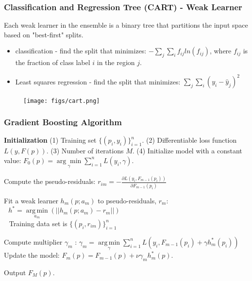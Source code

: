 \documentclass[t, pdftex]{beamer}
\begin{document}
\begin{frame}[shrink=10]
\frametitle{Classification and Regression Tree (CART) - Weak Learner}
Each weak learner in the ensemble is a binary tree that partitions the input space based on "best-first" splits.  
\begin{itemize}
\item classification - find the split that minimizes: $-\sum_j\sum_i f_{ij} ln(f_{ij})$, where $f_{ij}$ is the fraction of class label $i$ in the region $j$.
\item Least squares regression - find the split that minimizes: $\sum_j\sum_i(y_i - \hat y_{j})^2$
\end{itemize}

\begin{figure}[!htbp]
\centering
\texttt{[image: figs/cart.png]}
\label{model_overview}
\end{figure}
\end{frame}

\begin{frame}
\frametitle{Gradient Boosting Algorithm}
\begin{algorithm}[H]
    \tiny  
    \begin{algorithmic}[1]
        \STATE \textbf{Initialization} 
        \STATE (1) Training set $\{(p_i, y_i)\}_{i=1}^n$. 
        \STATE (2) Differentiable loss function $L(y, F(p))$. 
        \STATE (3) Number of iterations ${{M}}$.
        \STATE (4)   Initialize model with a constant value:
        $F_0(p) = \underset{\gamma}{\arg\min} \sum_{i=1}^n L(y_i, \gamma).$
        
        \STATE Compute the pseudo-residuals:  
        \STATE $r_{im} = -\frac{\partial L(y_i, F_{m-1}(p_i))}{\partial F_{m-1}(p_i)}$
        \ENDFOR
        
        \STATE Fit a weak learner $h_m(p; a_m)$ to pseudo-residuals, $r_{m}$: \\
        $\ \ \ h^* = \underset{a_m}{\operatorname{arg\,min}}(||h_m(p; a_m) - r_m||)$ \\
        $\ \ $ Training data set is $\{(p_i, r_{im})\}_{i=1}^n$ \;
        
        \STATE Compute multiplier $\gamma_m$ :
        $\gamma_m = \underset{\gamma}{\operatorname{arg\,min}} \sum_{i=1}^n L\left(y_i, F_{m-1}(p_i) + \gamma h^*_m(p_i)\right)$\;
        \STATE Update the model:
        $F_m(p) = F_{m-1}(p) + \nu \gamma_m h^*_m(p).$
        
        \ENDFOR
        \STATE Output $F_M(p).$
    \end{algorithmic}
    \label{alg:boosting}
\end{algorithm}
\cite{friedman2001}
\end{frame}
\end{document}
